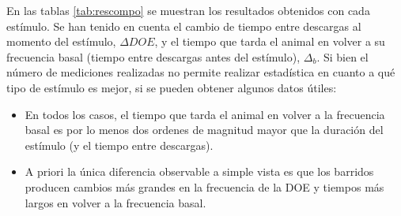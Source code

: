 En las tablas \ref{tab:rescompo} se muestran los resultados obtenidos con cada estímulo. Se han tenido en cuenta el cambio de tiempo entre descargas al momento del estímulo, $\Delta DOE$, y el tiempo que tarda el animal en volver a su frecuencia basal (tiempo entre descargas antes del estímulo), $\Delta_b$. Si bien el número de mediciones realizadas no permite realizar estadística en cuanto a qué tipo de estímulo es mejor, si se pueden obtener algunos datos útiles:
\begin{itemize}
	\item En todos los casos, el tiempo que tarda el animal en volver a la frecuencia basal es por lo menos dos ordenes de magnitud mayor que la duración del estímulo (y el tiempo entre descargas).
	\item A priori la única diferencia observable a simple vista es que los barridos producen cambios más grandes en la frecuencia de la DOE y tiempos más largos en volver a la frecuencia basal.
\end{itemize}
\newpage
